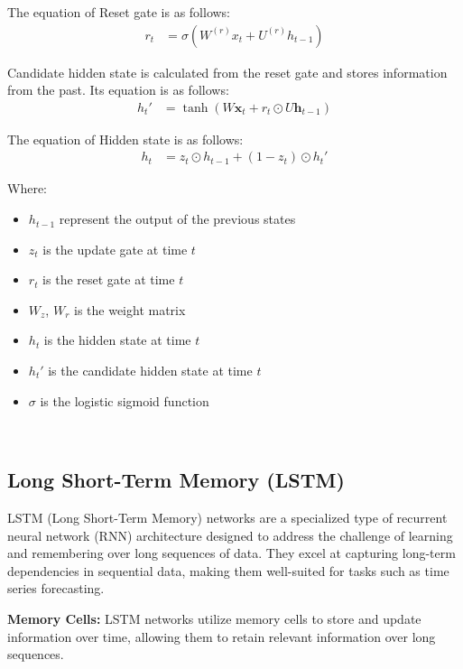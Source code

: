 \documentclass{ieeeojies}
\begin{document}
The equation of Reset gate is as follows:
\begin{align*}
r_t &= \sigma\left( W^{(r)} x_t + U^{(r)} h_{t-1} \right)
\end{align*}

Candidate hidden state is calculated from the reset gate and stores information from the past. Its equation is as follows:
\begin{align*}
h_t' &= \tanh(W \mathbf{x}_t + r_t \odot U \mathbf{h}_{t-1})
\end{align*}

The equation of Hidden state is as follows:
\begin{align*}
h_t &= z_t \odot h_{t-1} + (1 - z_t) \odot h_t'  
\end{align*}

Where:\\
    \begin{itemize}
        \item \(h_{t-1}\) represent the output of the previous states
        \item \(z_t\) is the update gate at time \(t\)
        \item \(r_t\) is the reset gate at time \(t\)
        \item \(W_z\), \(W_r\) is the weight matrix
        \item \(h_t\) is the hidden state at time \(t\)
        \item \(h_t'\) is the candidate hidden state at time \(t\)
        \item \(\sigma\) is the logistic sigmoid function \cite{gru_equation} \\
    \end{itemize}\\

\subsection{Long Short-Term Memory (LSTM)} 
LSTM (Long Short-Term Memory) networks are a specialized type of recurrent neural network (RNN) architecture designed to address the challenge of learning and remembering over long sequences of data. They excel at capturing long-term dependencies in sequential data, making them well-suited for tasks such as time series forecasting.\par
\noindent

\textbf{Memory Cells:} LSTM networks utilize memory cells to store and update information over time, allowing them to retain relevant information over long sequences.
  
\end{document}
